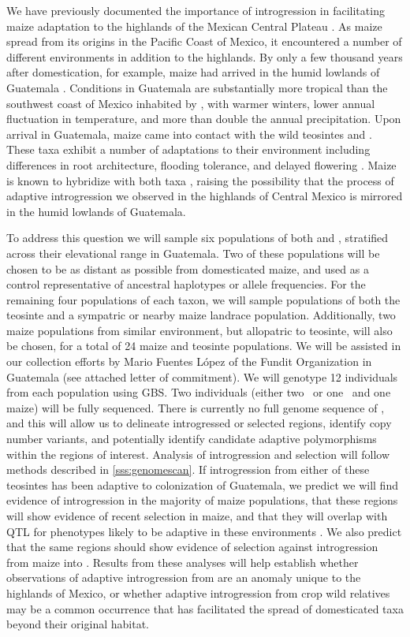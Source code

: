 We have previously documented the importance of introgression in facilitating maize adaptation to the highlands of the Mexican Central Plateau \citep{Hufford2013, Takuno15062015}.
As maize spread from its origins in the Pacific Coast of Mexico, it  encountered a number of different environments in addition to the highlands.
By only a few thousand years after domestication, for example, maize had arrived in the humid lowlands of Guatemala \citep{neff2006early}.  
Conditions in Guatemala are substantially more tropical than the southwest coast of Mexico inhabited by \zp, with warmer winters, lower annual fluctuation in temperature, and more than double the annual precipitation.
Upon arrival in Guatemala, maize came into contact with the wild teosintes \zh{} and \zl.  
These taxa exhibit a number of adaptations to their environment including differences in root architecture, flooding tolerance, and delayed flowering \citep{wilkes1967teosinte, mano2006}.
Maize is known to hybridize with both taxa \citep{wilkes1967teosinte}, raising the possibility that the process of adaptive introgression we observed in the highlands of Central Mexico is mirrored in the humid lowlands of Guatemala.

To address this question we will sample six populations of both \zl{} and \zh{}, stratified across their elevational range in Guatemala.  
Two of these populations will be chosen to be as distant as possible from domesticated maize, and used as a control representative of ancestral haplotypes or allele frequencies.  
For the remaining four populations of each taxon, we will sample populations of both the teosinte and a sympatric or nearby maize landrace population.
Additionally, two maize populations from similar environment, but allopatric to teosinte, will also be chosen, for a total of 24 maize and teosinte populations.
We will be assisted in our collection efforts by Mario Fuentes L\'{o}pez of the Fundit Organization in Guatemala (see attached letter of commitment).
We will genotype 12 individuals from each population using GBS. 
Two individuals (either two \zl\ or one \zl\ and one maize) will be fully sequenced.
There is currently no full genome sequence of \zl, and this will allow us to delineate introgressed or selected regions, identify copy number variants, and potentially identify candidate adaptive polymorphisms within the regions of interest.
Analysis of introgression and selection will follow methods described in \ref{sss:genomescan}.
If introgression from either of these teosintes has been adaptive to colonization of Guatemala, we predict we will find evidence of introgression in the majority of maize populations, that these regions will show evidence of recent selection in maize, and that they will overlap with QTL for phenotypes likely to be adaptive in these environments \citep[e.g.][]{omori2007qtl,mano2008linkage}.
We also predict that the same regions should show evidence of selection against introgression from maize into \zl.
Results from these analyses will help establish whether observations of adaptive introgression from \zm{} are an anomaly unique to the highlands of Mexico, or whether adaptive introgression from crop wild relatives may be a common occurrence that has facilitated the spread of domesticated taxa beyond their original habitat.

